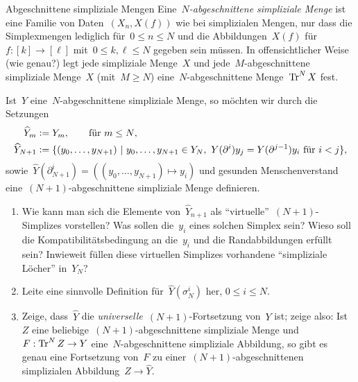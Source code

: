 \documentclass{uebblatt}
\begin{document}
\enlargethispage{2em}

\begin{aufgabe}{Abgeschnittene simpliziale Mengen}
Eine~\emph{$N$-abgeschnittene simpliziale Menge} ist eine Familie von
Daten~$(X_n,X(f))$ wie bei simplizialen Mengen, nur dass die Simplexmengen
lediglich für~$0 \leq n \leq N$ und die Abbildungen~$X(f)$ für~$f : [k] \to
[\ell]$ mit~$0 \leq k,\ell \leq N$ gegeben sein müssen. In offensichtlicher Weise
(wie genau?) legt jede simpliziale Menge~$X$ und jede~$M$-abgeschnittene
simpliziale Menge~$X$ (mit~$M \geq N$) eine~$N$-abgeschnittene Menge~$\operatorname{Tr}^N X$
fest.

Ist~$Y$ eine~$N$-abgeschnittene simpliziale Menge, so möchten wir durch die
Setzungen
\begin{align*}
  \widehat Y_m &\vcentcolon= Y_m, \qquad \text{für $m \leq N$,} \\
  \widehat Y_{N+1} &\vcentcolon= \{ (y_0,\ldots,y_{N+1}) \ |\
    y_0,\ldots,y_{N+1} \in Y_N,\
    \text{$Y(\partial^i)y_j = Y(\partial^{j-1})y_i$ für~$i < j$} \},
\end{align*}
sowie~$\widehat Y(\partial^i_{N+1}) = ((y_0,\ldots,y_{N+1}) \mapsto y_i)$
und gesunden Menschenverstand eine~$(N+1)$-abgeschnittene simpliziale Menge
definieren.

\begin{enumerate}
\item Wie kann man sich die Elemente von~$\widehat Y_{n+1}$ als
"`virtuelle"'~$(N+1)$-Simplizes vorstellen? Was sollen die~$y_i$ eines solchen
Simplex sein? Wieso soll die Kompatibilitätsbedingung an die~$y_i$ und die
Randabbildungen erfüllt sein? Inwieweit füllen diese virtuellen Simplizes
vorhandene "`simpliziale Löcher"' in~$Y_N$?

\item Leite eine sinnvolle Definition für~$\widehat Y(\sigma^i_N)$ her, $0 \leq i \leq N$.

\item Zeige, dass~$\widehat Y$ die \emph{universelle}~$(N+1)$-Fortsetzung
von~$Y$ ist; zeige also: Ist~$Z$ eine beliebige~$(N+1)$-abgeschnittene
simpliziale Menge und~$F : \operatorname{Tr}^N Z \to Y$ eine~$N$-abgeschnittene simpliziale
Abbildung, so gibt es genau eine Fortsetzung von~$F$ zu
einer~$(N+1)$-abgeschnittenen simplizialen Abbildung~$Z \to \widehat Y$.
\end{enumerate}
\end{aufgabe}
\end{document}
